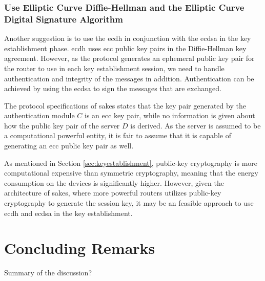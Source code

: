 \subsubsection{Use Elliptic Curve Diffie-Hellman and the Elliptic Curve Digital Signature Algorithm}

Another suggestion is to use the \gls{ecdh} in conjunction with the \gls{ecdsa} \cite{johnson2001elliptic} in the key establishment phase. \gls{ecdh} uses \gls{ecc} public key pairs in the Diffie-Hellman key agreement. However, as the protocol generates an ephemeral public key pair for the router to use in each key establishment session, we need to handle authentication and integrity of the messages in addition. Authentication can be achieved by using the \gls{ecdsa} to sign the messages that are exchanged.

The protocol specifications of \gls{sakes} states that the key pair generated by the authentication module $C$ is an \gls{ecc} key pair, while no information is given about how the public key pair of the server $D$ is derived. As the server is assumed to be a computational powerful entity, it is fair to assume that it is capable of generating an \gls{ecc} public key pair as well.

As mentioned in Section \ref{sec:keyestablishment}, public-key cryptography is more computational expensive than symmetric cryptography, meaning that the energy consumption on the devices is significantly higher. However, given the architecture of \gls{sakes}, where more powerful routers utilizes public-key cryptography to generate the session key, it may be an feasible approach to use \gls{ecdh} and \gls{ecdsa} in the key establishment. 


\section{Concluding Remarks}

Summary of the discussion?



